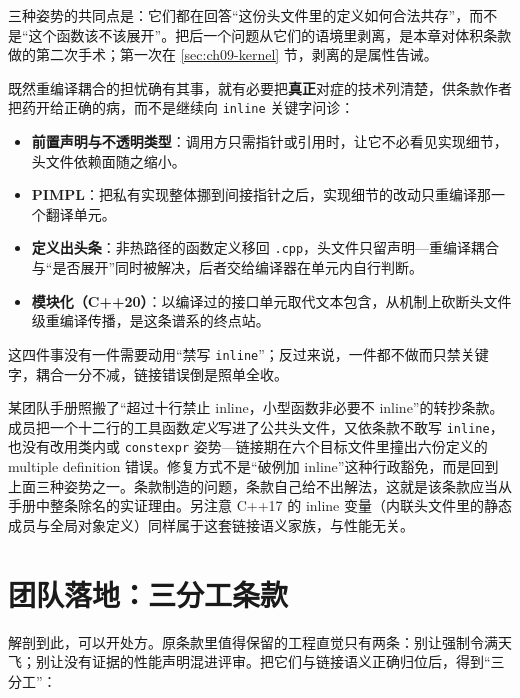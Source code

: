 \documentclass[12pt,a4paper,fontset=fandol]{ctexbook}
\newcommand{\cpp}[1]{C++#1}
\newcommand{\Tp}[1]{\texttt{#1}}
\begin{document}
三种姿势的共同点是：它们都在回答``这份头文件里的定义如何合法共存''，而不是``这个函数该不该展开''。把后一个问题从它们的语境里剥离，是本章对体积条款做的第二次手术；第一次在 \ref{sec:ch09-kernel} 节，剥离的是属性告诫。

既然重编译耦合的担忧确有其事，就有必要把\textbf{真正}对症的技术列清楚，供条款作者把药开给正确的病，而不是继续向 \Tp{inline} 关键字问诊：

\begin{itemize}
  \item \textbf{前置声明与不透明类型}：调用方只需指针或引用时，让它不必看见实现细节，头文件依赖面随之缩小。
  \item \textbf{PIMPL}：把私有实现整体挪到间接指针之后，实现细节的改动只重编译那一个翻译单元。
  \item \textbf{定义出头条}：非热路径的函数定义移回 \Tp{.cpp}，头文件只留声明---重编译耦合与``是否展开''同时被解决，后者交给编译器在单元内自行判断。
  \item \textbf{模块化（\cpp{20}）}：以编译过的接口单元取代文本包含，从机制上砍断头文件级重编译传播，是这条谱系的终点站。
\end{itemize}

这四件事没有一件需要动用``禁写 \Tp{inline}''；反过来说，一件都不做而只禁关键字，耦合一分不减，链接错误倒是照单全收。

\begin{warning}[title={被``禁写 inline''逼出来的链接错误}]
某团队手册照搬了``超过十行禁止 inline，小型函数非必要不 inline''的转抄条款。成员把一个十二行的工具函数\textit{定义}写进了公共头文件，又依条款不敢写 \Tp{inline}，也没有改用类内或 \Tp{constexpr} 姿势---链接期在六个目标文件里撞出六份定义的 multiple definition 错误。修复方式不是``破例加 inline''这种行政豁免，而是回到上面三种姿势之一。条款制造的问题，条款自己给不出解法，这就是该条款应当从手册中整条除名的实证理由。另注意 \cpp{17} 的 inline 变量（内联头文件里的静态成员与全局对象定义）同样属于这套链接语义家族，与性能无关。
\end{warning}

\section{团队落地：三分工条款}
\label{sec:ch09-team}

解剖到此，可以开处方。原条款里值得保留的工程直觉只有两条：别让强制令满天飞；别让没有证据的性能声明混进评审。把它们与链接语义正确归位后，得到``三分工''：
\end{document}
